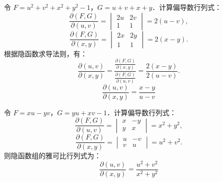 \begin{solution}

    令 $F = u^2 + v^2 + x^2 + y^2 - 1$，$G = u + v + x + y$．计算偏导数行列式：
    \begin{equation}
        \frac{\partial(F,G)}{\partial(u,v)} =
        \begin{vmatrix}
            2u & 2v \\
            1  & 1
        \end{vmatrix} = 2(u - v),
    \end{equation}
    \begin{equation}
        \frac{\partial(F,G)}{\partial(x,y)} =
        \begin{vmatrix}
            2x & 2y \\
            1  & 1
        \end{vmatrix} = 2(x - y).
    \end{equation}
    根据隐函数求导法则，有：
    \begin{equation}
        \frac{\partial(u,v)}{\partial(x,y)} = \frac{\frac{\partial(F,G)}{\partial(x,y)}}{\frac{\partial(F,G)}{\partial(u,v)}} = \frac{2(x - y)}{2(u - v)}.
    \end{equation}
    \begin{equation}
        \boxed{\frac{\partial(u,v)}{\partial(x,y)} = \frac{x - y}{u - v}}
    \end{equation}


    令 $F = xu - yv$，$G = yu + xv - 1$．计算偏导数行列式：
    \begin{equation}
        \frac{\partial(F,G)}{\partial(u,v)} =
        \begin{vmatrix}
            x & -y \\
            y & x
        \end{vmatrix} = x^2 + y^2,
    \end{equation}
    \begin{equation}
        \frac{\partial(F,G)}{\partial(x,y)} =
        \begin{vmatrix}
            u & -v \\
            v & u
        \end{vmatrix} = u^2 + v^2.
    \end{equation}
    则隐函数组的雅可比行列式为：
    \begin{equation}
        \boxed{\frac{\partial(u,v)}{\partial(x,y)} = \frac{u^2 + v^2}{x^2 + y^2}}
    \end{equation}


\end{solution}
